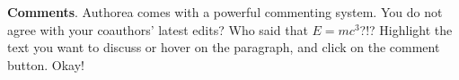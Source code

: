 \textbf{Comments}. Authorea comes with a powerful commenting system. You do not agree with your coauthors' latest edits? Who said that $E  =  mc^{3}$?!? Highlight the text you want to discuss or hover on the paragraph, and click on the comment button. Okay!